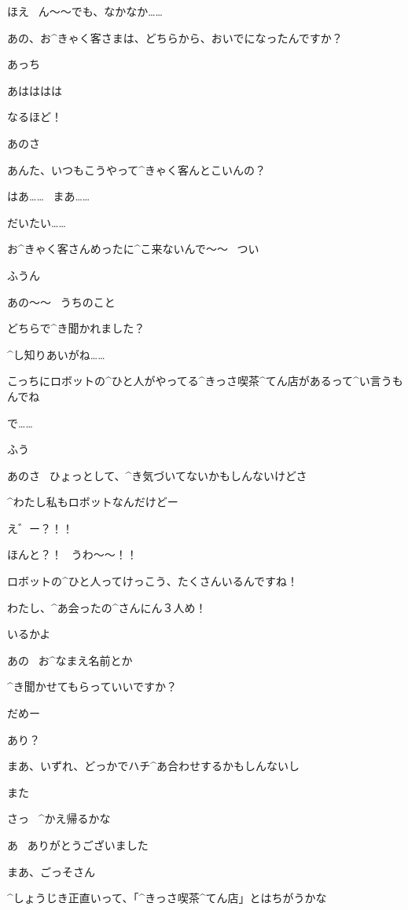\Alpha ほえ
\ ん〜〜でも、なかなか……

\page
\Alpha あの、お^{きゃく}{客}さまは、どちらから、おいでになったんですか？

\Maruko あっち

\Alpha あはははは

\Alpha なるほど！

\Maruko あのさ

\Maruko あんた、いつもこうやって^{きゃく}{客}んとこいんの？

\Alpha はあ……
\ まあ……

\Alpha だいたい……

\page
\Alpha お^{きゃく}{客}さんめったに^{こ}{来}ないんで〜〜
\ つい

\Maruko ふうん

\Alpha あの〜〜
\ うちのこと

\Alpha どちらで^{き}{聞}かれました？

\Maruko ^{し}{知}りあいがね……

\Maruko こっちにロボットの^{ひと}{人}がやってる^{きっさ}{喫茶}^{てん}{店}があるって^{い}{言}うもんでね

\page
\Maruko で……

\Maruko ふう

\Maruko あのさ
\ ひょっとして、^{き}{気}づいてないかもしんないけどさ

\Maruko ^{わたし}{私}もロボットなんだけどー

\Alpha え゛ー？！！

\Alpha ほんと？！
\ うわ〜〜！！

\page
\Alpha ロボットの^{ひと}{人}ってけっこう、たくさんいるんですね！

\Alpha わたし、^{あ}{会}ったの^{さんにん}{３人}め！

\Maruko いるかよ

\Alpha あの
\ お^{なまえ}{名前}とか

\Alpha ^{き}{聞}かせてもらっていいですか？

\Maruko だめー

\Alpha あり？

\page
\Maruko まあ、いずれ、どっかでハチ^{あ}{合}わせするかもしんないし

\Maruko また

\Maruko さっ
\ ^{かえ}{帰}るかな

\Alpha あ
\ ありがとうございました

\Maruko まあ、ごっそさん

\Maruko ^{しょうじき}{正直}いって、「^{きっさ}{喫茶}^{てん}{店}」とはちがうかな

